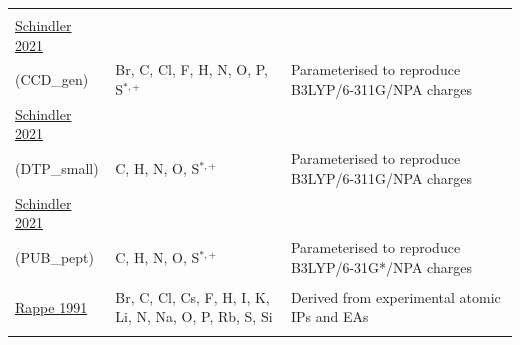 \documentclass[oneside]{memoir}
\begin{document}
\begin{longtable}{p{4cm} p{3.3cm} p{8cm}}
\addlinespace
\hline\hline
\addlinespace[5pt]\multicolumn{3}{l}{\textbf{SQE+qp}} \\\addlinespace[5pt]
\addlinespace[5pt] \href{https://doi.org/10.1186/s13321-021-00528-w}{Schindler 2021}\\(CCD\_gen) & Br, C, Cl, F, H, N, O, P, S$^{*,+}$ & Parameterised to reproduce B3LYP/6-311G/NPA charges \\
\addlinespace[5pt]\midrule\addlinespace[5pt] \href{https://doi.org/10.1186/s13321-021-00528-w}{Schindler 2021}\\(DTP\_small) & C, H, N, O, S$^{*,+}$ & Parameterised to reproduce B3LYP/6-311G/NPA charges \\
\addlinespace[5pt]\midrule\addlinespace[5pt] \href{https://doi.org/10.1186/s13321-021-00528-w}{Schindler 2021}\\(PUB\_pept) & C, H, N, O, S$^{*,+}$ & Parameterised to reproduce B3LYP/6-31G*/NPA charges \\
\addlinespace
\hline\hline
\addlinespace[5pt]\multicolumn{3}{l}{\textbf{TSEF}} \\\addlinespace[5pt]
\addlinespace[5pt] \href{https://doi.org/10.1021/j100161a070}{Rappe 1991} & Br, C, Cl, Cs, F, H, I, K, Li, N, Na, O, P, Rb, S, Si & Derived from experimental atomic IPs and EAs \\
\addlinespace
\end{longtable}

\printbibliography
\end{document}
